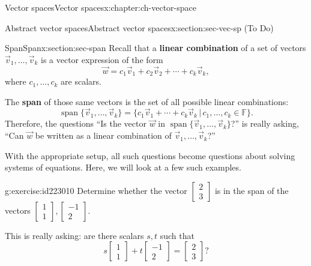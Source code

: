 \documentclass[oneside,10pt,]{book}
\newcommand{\terminology}[1]{\textbf{#1}}
\numberwithin{equation}{section}
\newcommand{\spn}{\operatorname{span}}
\newcommand{\bbm}{\begin{bmatrix}}
\newcommand{\ebm}{\end{bmatrix}}
\begin{document}
%
%
\typeout{************************************************}
\typeout{************************************************}
%
\begin{chapterptx}{Vector spaces}{}{Vector spaces}{}{}{x:chapter:ch-vector-space}
%
%
\typeout{************************************************}
\typeout{************************************************}
%
\begin{sectionptx}{Abstract vector spaces}{}{Abstract vector spaces}{}{}{x:section:sec-vec-sp}
(To Do)%
\end{sectionptx}
%
%
\typeout{************************************************}
\typeout{************************************************}
%
\begin{sectionptx}{Span}{}{Span}{}{}{x:section:sec-span}
Recall that a \terminology{linear combination} of a set of vectors \(\vec{v}_1,\ldots, \vec{v}_k\) is a vector expression of the form%
\begin{equation*}
\vec{w}=c_1\vec{v}_1+c_2\vec{v}_2+\cdots +c_k\vec{v}_k,
\end{equation*}
where \(c_1,\ldots, c_k\) are scalars.%
\par
The \terminology{span} of those same vectors is the set of all possible linear combinations:%
\begin{equation*}
\spn\{\vec{v}_1,\ldots, \vec{v}_k\} = \{c_1\vec{v}_1+ \cdots + c_k\vec{v}_k \,|\, c_1,\ldots, c_k \in \mathbb{F}\}.
\end{equation*}
Therefore, the questions ``Is the vector \(\vec{w}\) in \(\spn\{\vec{v}_1,\ldots, \vec{v}_k\}\)?'' is really asking, ``Can \(\vec{w}\) be written as a linear combination of \(\vec{v}_1,\ldots, \vec{v}_k\)?''%
\par
With the appropriate setup, all such questions become questions about solving systems of equations. Here, we will look at a few such examples.%
\begin{inlineexercise}{}{g:exercise:id223010}%
Determine whether the vector \(\bbm 2\\3\ebm\) is in the span of the vectors \(\bbm 1\\1\ebm,\bbm -1\\2\ebm\).%
\end{inlineexercise}
This is really asking: are there scalars \(s,t\) such that%
\begin{equation*}
s\bbm 1\\1\ebm + t\bbm -1\\2\ebm = \bbm 2\\3\ebm\text{?}

\end{equation*}
\end{sectionptx}
\end{chapterptx}
\end{document}
